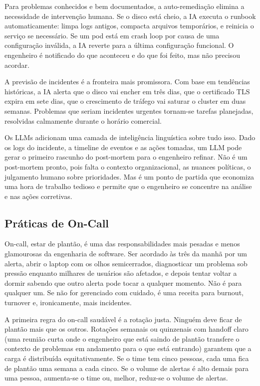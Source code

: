 Para problemas conhecidos e bem documentados, a auto-remediação elimina a
necessidade de intervenção humana. Se o disco está cheio, a IA executa o
runbook automaticamente: limpa logs antigos, compacta arquivos temporários,
e reinicia o serviço se necessário. Se um pod está em crash loop por causa de
uma configuração inválida, a IA reverte para a última configuração funcional.
O engenheiro é notificado do que aconteceu e do que foi feito, mas não precisou
acordar.

A previsão de incidentes é a fronteira mais promissora. Com base em tendências
históricas, a IA alerta que o disco vai encher em três dias, que o certificado
TLS expira em sete dias, que o crescimento de tráfego vai saturar o cluster em
duas semanas. Problemas que seriam incidentes urgentes tornam-se tarefas
planejadas, resolvidas calmamente durante o horário comercial.

Os LLMs adicionam uma camada de inteligência linguística sobre tudo isso. Dado
os logs do incidente, a timeline de eventos e as ações tomadas, um LLM pode
gerar o primeiro rascunho do post-mortem para o engenheiro refinar. Não é um
post-mortem pronto, pois falta o contexto organizacional, as nuances políticas, o
julgamento humano sobre prioridades. Mas é um ponto de partida que economiza
uma hora de trabalho tedioso e permite que o engenheiro se concentre na análise
e nas ações corretivas.

\subsection{Práticas de On-Call}

On-call, estar de plantão, é uma das responsabilidades mais pesadas e menos
glamourosas da engenharia de software. Ser acordado às três da manhã por um
alerta, abrir o laptop com os olhos semicerrados, diagnosticar um problema sob
pressão enquanto milhares de usuários são afetados, e depois tentar voltar a
dormir sabendo que outro alerta pode tocar a qualquer momento. Não é para
qualquer um. Se não for gerenciado com cuidado, é uma receita para burnout,
turnover e, ironicamente, mais incidentes.

A primeira regra do on-call saudável é a rotação justa. Ninguém deve ficar de
plantão mais que os outros. Rotações semanais ou quinzenais com handoff claro
(uma reunião curta onde o engenheiro que está saindo de plantão transfere o
contexto de problemas em andamento para o que está entrando) garantem que a
carga é distribuída equitativamente. Se o time tem cinco pessoas, cada uma fica
de plantão uma semana a cada cinco. Se o volume de alertas é alto demais para
uma pessoa, aumenta-se o time ou, melhor, reduz-se o volume de alertas.

